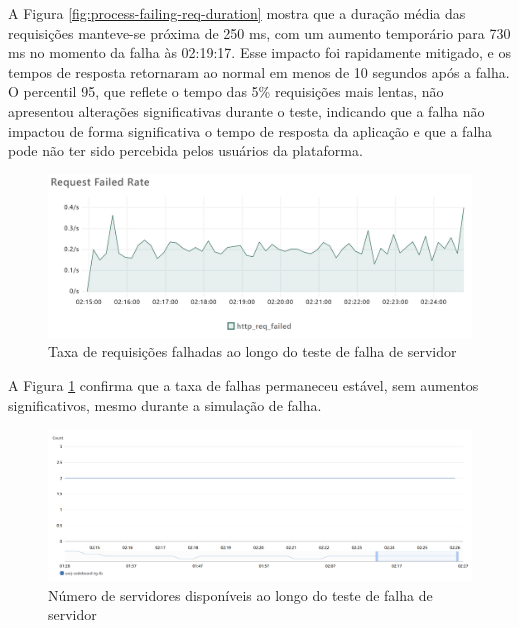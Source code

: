 A Figura \ref{fig:process-failing-req-duration} mostra que a duração média das requisições manteve-se próxima de 250 ms, com um aumento temporário para 730 ms no momento da falha às 02:19:17. Esse impacto foi rapidamente mitigado, e os tempos de resposta retornaram ao normal em menos de 10 segundos após a falha. O percentil 95, que reflete o tempo das 5\% requisições mais lentas, não apresentou alterações significativas durante o teste, indicando que a falha não impactou de forma significativa o tempo de resposta da aplicação e que a falha pode não ter sido percebida pelos usuários da plataforma.

\begin{figure}[H]
    \centering
    \includegraphics[width=1\textwidth]{assets/process-failing-test/req-failed-rate.png}
    \caption{Taxa de requisições falhadas ao longo do teste de falha de servidor}
    \label{fig:process-failing-req-failed-rate}
\end{figure}

A Figura \ref{fig:process-failing-req-failed-rate} confirma que a taxa de falhas permaneceu estável, sem aumentos significativos, mesmo durante a simulação de falha. 

\begin{figure}[H]
    \centering
    \includegraphics[width=1\textwidth]{assets/process-failing-test/healthy-hosts.png}
    \caption{Número de servidores disponíveis ao longo do teste de falha de servidor}
    \label{fig:process-failing-healthy-hosts}
\end{figure}

